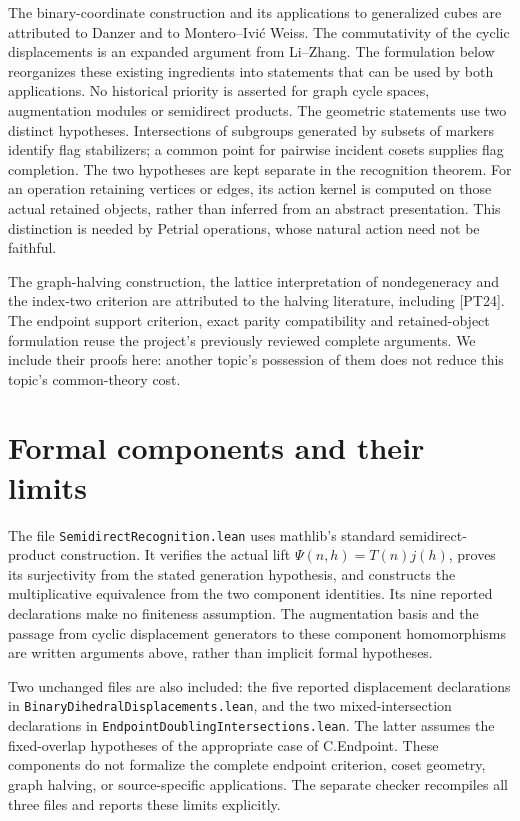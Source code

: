 The binary-coordinate construction and its applications to generalized
cubes are attributed to Danzer and to Montero--Ivi\'c Weiss. The
commutativity of the cyclic displacements is an expanded argument from
Li--Zhang. The formulation below reorganizes these existing ingredients
into statements that can be used by both applications. No historical
priority is asserted for graph cycle spaces, augmentation modules or
semidirect products.
The geometric statements use two distinct hypotheses. Intersections of
subgroups generated by subsets of markers identify flag stabilizers;
a common point for pairwise incident cosets supplies flag completion.
The two hypotheses are kept separate in the recognition theorem.
For an operation retaining vertices or edges, its action kernel is
computed on those actual retained objects, rather than inferred from
an abstract presentation. This distinction is needed by Petrial
operations, whose natural action need not be faithful.

The graph-halving construction, the lattice interpretation of
nondegeneracy and the index-two criterion are attributed to the
halving literature, including [PT24]. The endpoint support criterion,
exact parity compatibility and retained-object formulation reuse the
project's previously reviewed complete arguments. We include their
proofs here: another topic's possession of them does not reduce this
topic's common-theory cost.




\section{Formal components and their limits}
The file \texttt{SemidirectRecognition.lean} uses mathlib's standard
semidirect-product construction. It verifies the actual lift
$\Psi(n,h)=T(n)j(h)$, proves its surjectivity from the stated generation
hypothesis, and constructs the multiplicative equivalence from the two
component identities. Its nine reported declarations make no
finiteness assumption. The augmentation basis and the passage from
cyclic displacement generators to these component homomorphisms are
written arguments above, rather than implicit formal hypotheses.

Two unchanged files are also included: the five reported displacement
declarations in \texttt{BinaryDihedralDisplacements.lean}, and the two
mixed-intersection declarations in \texttt{EndpointDoublingIntersections.lean}.
The latter assumes the fixed-overlap hypotheses of the appropriate
case of C.Endpoint. These components do not formalize the complete
endpoint criterion, coset geometry, graph halving, or source-specific
applications. The separate checker recompiles all three files and
reports these limits explicitly.

